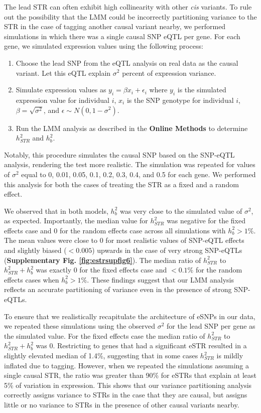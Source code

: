 The lead STR can often exhibit high collinearity with other \emph{cis} variants. To rule out the possibility that the LMM could be incorrectly partitioning variance to the STR in the case of tagging another causal variant nearby, we performed simulations in which there was a single causal SNP eQTL per gene. For each gene, we simulated expression values using the following process:

\begin{enumerate}
\item Choose the lead SNP from the eQTL analysis on real data as the causal variant. Let this eQTL explain $\sigma^2$ percent of expression variance.
\item Simulate expression values as $y_i=\beta x_i+\epsilon_i$ where $y_i$ is the simulated expression value for individual $i$, $x_i$ is the SNP genotype for individual $i$, $\beta = \sqrt{\sigma^2}$, and $\epsilon \sim N(0, 1-\sigma^2)$.
\item Run the LMM analysis as described in the \textbf{Online Methods} to determine $h^2_{STR}$ and $h^2_{b}$.
\end{enumerate}

Notably, this procedure simulates the causal SNP based on the SNP-eQTL analysis, rendering the test more realistic.
The simulation was repeated for values of $\sigma^2$ equal to 0, 0.01, 0.05, 0.1, 0.2, 0.3, 0.4, and 0.5 for each gene. We performed this analysis for both the cases of treating the STR as a fixed and a random effect.

We observed that in both models, $h^2_{b}$ was very close to the simulated value of $\sigma^2$, as expected. Importantly, the median value for $h^2_{STR}$ was negative for the fixed effects case and 0 for the random effects case across all simulations with $h^2_b>1\%$. The mean values were close to 0 for most realistic values of SNP-eQTL effects and slightly biased ($<0.005$) upwards in the case of very strong SNP-eQTLs (\textbf{Supplementary Fig. \ref{fig:estrsupfig6}}). The median ratio of $h^2_{STR}$ to $h^2_{STR}+h^2_{b}$ was exactly 0 for the fixed effects case and $<0.1\%$ for the random effects cases when $h^2_b>1\%$. These findings suggest that our LMM analysis reflects an accurate partitioning of variance even in the presence of strong SNP-eQTLs.

To ensure that we realistically recapitulate the architecture of eSNPs in our data, we repeated these simulations using the observed $\sigma^2$ for the lead SNP per gene as the simulated value. For the fixed effects case the median ratio of $h^2_{STR}$ to $h^2_{STR}+h^2_{b}$ was 0. Restricting to genes that had a significant eSTR resulted in a slightly elevated median of 1.4\%, suggesting that in some cases $h^2_{STR}$ is mildly inflated due to tagging. However, when we repeated the simulations assuming a single causal STR, the ratio was greater than 90\% for eSTRs that explain at least 5\% of variation in expression. This shows that our variance partitioning analysis correctly assigns variance to STRs in the case that they are causal, but assigns little or no variance to STRs in the presence of other causal variants nearby.


